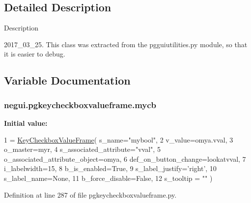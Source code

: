 \subsection{Detailed Description}
\begin{DoxyVerb}Description

2017_03_25.  This class was extracted from the
pgguiutilities.py module, so that it is easier
to debug.
\end{DoxyVerb}
 

\subsection{Variable Documentation}
\subsubsection[{\texorpdfstring{mycb}{mycb}}]{\setlength{\rightskip}{0pt plus 5cm}negui.\+pgkeycheckboxvalueframe.\+mycb}\hypertarget{namespacenegui_1_1pgkeycheckboxvalueframe_acbefdf5eb321a3bc000bf3da863ed43d}{}\label{namespacenegui_1_1pgkeycheckboxvalueframe_acbefdf5eb321a3bc000bf3da863ed43d}
{\bfseries Initial value\+:}
\begin{DoxyCode}
1 = \hyperlink{classnegui_1_1pgkeycheckboxvalueframe_1_1KeyCheckboxValueFrame}{KeyCheckboxValueFrame}( s\_name=\textcolor{stringliteral}{"mybool"}, 
2             v\_value=omya.vval,
3             o\_master=myr, 
4             s\_associated\_attribute=\textcolor{stringliteral}{"vval"},
5             o\_associated\_attribute\_object=omya,
6             def\_on\_button\_change=lookatvval,
7             i\_labelwidth=15,
8             b\_is\_enabled=\textcolor{keyword}{True},
9             s\_label\_justify=\textcolor{stringliteral}{'right'},
10             s\_label\_name=\textcolor{keywordtype}{None},
11             b\_force\_disable=\textcolor{keyword}{False},
12             s\_tooltip = \textcolor{stringliteral}{""} )
\end{DoxyCode}


Definition at line 287 of file pgkeycheckboxvalueframe.\+py.

